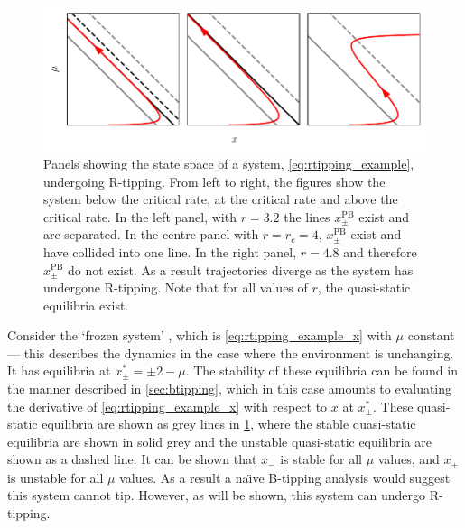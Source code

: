 \begin{figure}
  \centering
  \includegraphics[width=\textwidth,keepaspectratio]{rate}
  \caption[R-tipping mechanism]{Panels showing the state space of a system, \cref{eq:rtipping_example}, undergoing R-tipping.
    From left to right, the figures show the system below the critical rate, at the critical rate and above the critical rate. In the left panel, with $r=3.2$ the lines
    $x^{\mathrm{PB}}_{\pm}$ exist and are separated. In the centre panel with $r = r_c = 4$, $x^{\mathrm{PB}}_{\pm}$ exist and have collided into one line. In the right panel,
    $r = 4.8$ and therefore $x^{\mathrm{PB}}_{\pm}$ do not exist. As a result trajectories diverge as the system has undergone R-tipping. Note that for all values of $r$, the
    quasi-static equilibria exist.}
  \label{fig:rate_tipping}
\end{figure}

Consider the `frozen system' \parencite{Wieczorek2021}, which is \cref{eq:rtipping_example_x} with $\mu$ constant --- this describes the dynamics
in the case where the environment is unchanging. It has equilibria at
$x^*_{\pm} = \pm 2 - \mu$. The stability of these equilibria can be found in the manner described in \cref{sec:btipping}, which in this case amounts to evaluating
the derivative of \cref{eq:rtipping_example_x} with respect to $x$ at $x^*_{\pm}$. These quasi-static equilibria are shown as grey lines in \cref{fig:rate_tipping}, where
the stable quasi-static equilibria are shown in solid grey and the unstable quasi-static equilibria are shown as a dashed line.
It can be shown that $x_-$ is stable for all $\mu$ values, and $x_+$ is unstable for all $\mu$ values. As a result a na{\"\i}ve B-tipping analysis
would suggest this system cannot tip. However, as will be shown, this system can undergo R-tipping.

